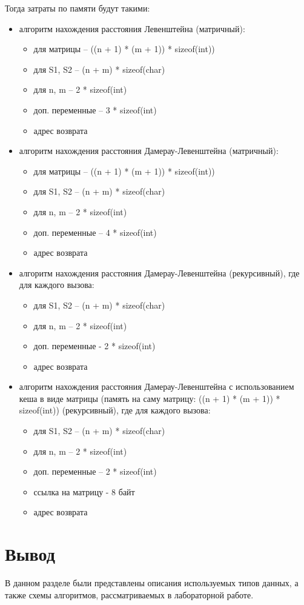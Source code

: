 Тогда затраты по памяти будут такими:
\begin{itemize}
    \item алгоритм нахождения расстояния Левенштейна (матричный):

    \begin{itemize}
        \item для матрицы -- ((n + 1) * (m + 1)) * sizeof(int))
        \item для S1, S2 -- (n + m) * sizeof(char)
        \item для n, m -- 2 * sizeof(int)
        \item доп. переменные -- 3 * sizeof(int)
        \item адрес возврата
    \end{itemize}

    \item алгоритм нахождения расстояния Дамерау-Левенштейна (матричный):

    \begin{itemize}
        \item для матрицы -- ((n + 1) * (m + 1)) * sizeof(int))
        \item для S1, S2 -- (n + m) * sizeof(char)
        \item для n, m -- 2 * sizeof(int)
        \item доп. переменные -- 4 * sizeof(int)
        \item адрес возврата
    \end{itemize}

    \item алгоритм нахождения расстояния Дамерау-Левенштейна (рекурсивный), где для каждого вызова:

    \begin{itemize}
        \item для S1, S2 -- (n + m) * sizeof(char)
        \item для n, m -- 2 * sizeof(int)
        \item доп. переменные - 2 * sizeof(int)
        \item адрес возврата
    \end{itemize}

    \item алгоритм нахождения расстояния Дамерау-Левенштейна с использованием кеша в виде матрицы (память на саму матрицу: ((n + 1) * (m + 1)) * sizeof(int)) (рекурсивный), где для каждого вызова:

    \begin{itemize}
        \item для S1, S2 -- (n + m) * sizeof(char)
        \item для n, m -- 2 * sizeof(int)
        \item доп. переменные -- 2 * sizeof(int)
        \item ссылка на матрицу - 8 байт
        \item адрес возврата
    \end{itemize}

\end{itemize}

\section{Вывод}
В данном разделе были представлены описания используемых типов данных, а также схемы алгоритмов, рассматриваемых в лабораторной работе.